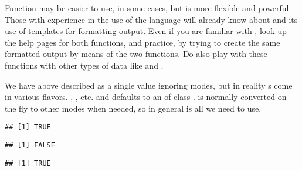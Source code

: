 \documentclass[krantz2]{krantz}\usepackage{knitr}
\begin{document}
\begin{playground}
Function  may be easier to use, in some cases, but  is more flexible and powerful. Those with experience in the use of the \Clang language will already know about  and its use of templates for formatting output. Even if you are familiar with  \Clang, look up the help pages for both functions, and practice, by trying to create the same formatted output by means of the two functions. Do also play with these functions with other types of data like  and .
\end{playground}

\begin{explainbox}
We have above described  as a single value ignoring modes, but in reality s come in various flavors. , , etc. and  defaults to an  of class .  is normally converted on the fly to other modes when needed, so in general  is all we need to use.

\begin{knitrout}\footnotesize
{}\color{fgcolor}\begin{kframe}
\begin{alltt}
 \hlkwb{<-} \hlstd{(}\hlstd{,} \hlstd{)}
\hlstd{(a[}\hlstd{])}
\end{alltt}
\begin{verbatim}
## [1] TRUE
\end{verbatim}
\begin{alltt}
\hlstd{(}\hlstd{)}
\end{alltt}
\begin{verbatim}
## [1] FALSE
\end{verbatim}
\end{kframe}
\end{knitrout}

\begin{knitrout}\footnotesize
{}\color{fgcolor}\begin{kframe}
\begin{alltt}
 \hlkwb{<-} \hlstd{(}\hlstd{,} \hlstd{)}
\hlstd{(b[}\hlstd{])}
\end{alltt}
\begin{verbatim}
## [1] TRUE
\end{verbatim}
\end{kframe}
\end{knitrout}


\end{explainbox}
\end{document}
